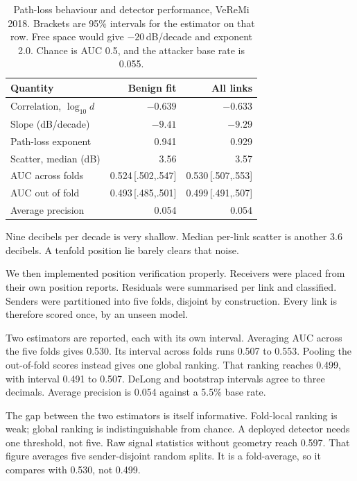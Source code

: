\documentclass[conference]{IEEEtran}
\begin{document}
\begin{table}[t]
\caption{Path-loss behaviour and detector performance, VeReMi 2018.
Brackets are 95\% intervals for the estimator on that row.
Free space would give $-20$\,dB/decade and exponent 2.0.
Chance is AUC 0.5, and the attacker base rate is 0.055.}
\label{tab:pathloss}
\centering
\scriptsize
\begin{tabular}{@{}lrr@{}}
\toprule
Quantity & Benign fit & All links \\
\midrule
Correlation, $\log_{10} d$ & $-0.639$ & $-0.633$ \\
Slope (dB/decade) & $-9.41$ & $-9.29$ \\
Path-loss exponent & 0.941 & 0.929 \\
Scatter, median (dB) & 3.56 & 3.57 \\
\midrule
AUC across folds & 0.524\,[.502,.547] & 0.530\,[.507,.553] \\
AUC out of fold & 0.493\,[.485,.501] & 0.499\,[.491,.507] \\
Average precision & 0.054 & 0.054 \\
\bottomrule
\end{tabular}
\end{table}

Nine decibels per decade is very shallow.
Median per-link scatter is another 3.6 decibels.
A tenfold position lie barely clears that noise.

We then implemented position verification properly.
Receivers were placed from their own position reports.
Residuals were summarised per link and classified.
Senders were partitioned into five folds, disjoint by construction.
Every link is therefore scored once, by an unseen model.

Two estimators are reported, each with its own interval.
Averaging AUC across the five folds gives 0.530.
Its interval across folds runs 0.507 to 0.553.
Pooling the out-of-fold scores instead gives one global ranking.
That ranking reaches 0.499, with interval 0.491 to 0.507.
DeLong and bootstrap intervals agree to three decimals.
Average precision is 0.054 against a 5.5\% base rate.

The gap between the two estimators is itself informative.
Fold-local ranking is weak; global ranking is indistinguishable from chance.
A deployed detector needs one threshold, not five.
Raw signal statistics without geometry reach 0.597.
That figure averages five sender-disjoint random splits.
It is a fold-average, so it compares with 0.530, not 0.499.
\end{document}
